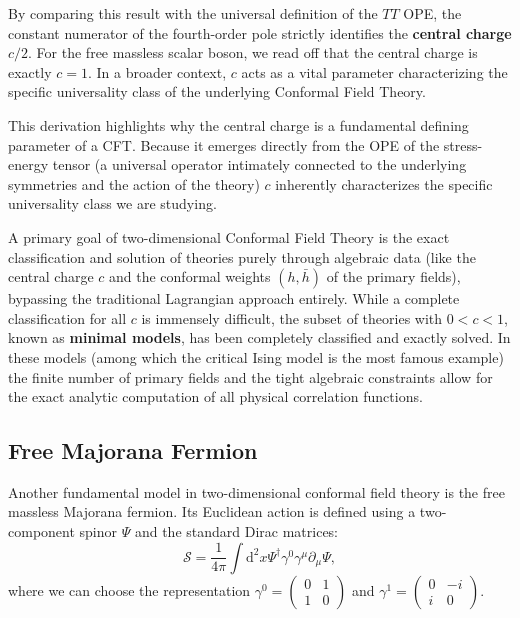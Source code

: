 By comparing this result with the universal definition of the \(TT\) OPE, the constant numerator of the fourth-order pole strictly identifies the \textbf{central charge} \(c/2\). For the free massless scalar boson, we read off that the central charge is exactly \(c = 1\). In a broader context, \(c\) acts as a vital parameter characterizing the specific universality class of the underlying Conformal Field Theory.

This derivation highlights why the central charge is a fundamental defining parameter of a CFT. Because it emerges directly from the OPE of the stress-energy tensor (a universal operator intimately connected to the underlying symmetries and the action of the theory) \(c\) inherently characterizes the specific universality class we are studying.

A primary goal of two-dimensional Conformal Field Theory is the exact classification and solution of theories purely through algebraic data (like the central charge \(c\) and the conformal weights \((h,\bar{h})\) of the primary fields), bypassing the traditional Lagrangian approach entirely. While a complete classification for all \(c\) is immensely difficult, the subset of theories with \(0 < c < 1\), known as \textbf{minimal models}, has been completely classified and exactly solved. In these models (among which the critical Ising model is the most famous example) the finite number of primary fields and the tight algebraic constraints allow for the exact analytic computation of all physical correlation functions.

\subsection{Free Majorana Fermion}

Another fundamental model in two-dimensional conformal field theory is the free massless Majorana fermion. Its Euclidean action is defined using a two-component spinor \(\Psi\) and the standard Dirac matrices:
\[
    \mathcal{S} = \frac{1}{4\pi} \int \mathrm{d}^2x \Psi^\dagger \gamma^0 \gamma^\mu \partial_\mu \Psi,
\]
where we can choose the representation \(\gamma^0 = \begin{pmatrix} 0 & 1 \\ 1 & 0 \end{pmatrix}\) and \(\gamma^1 = \begin{pmatrix} 0 & -i \\ i & 0 \end{pmatrix}\).

